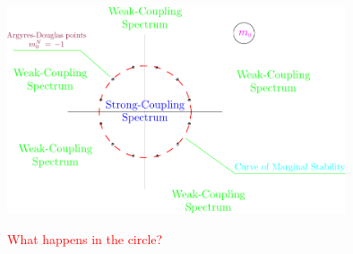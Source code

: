 \documentclass[12pt,letterpaper,landscape,KOMA,smallheadings,calcdimensions,display]{powersem}
\begin{document}
\begin{slide}

\vspace*{1.0cm}
\begin{center}
\includegraphics[width=10.0cm]{mplane.pdf}
\end{center}

\end{slide}


\begin{slide}

\centerline{\Huge \textcolor{red}{What happens in the circle?}}

\liststepwise{

\step{
\vspace{2cm}
\begin{center}
\Huge \textcolor{blue}{Mirror symmetry gives}

      \textcolor{blue}{the spectrum around the origin}
\end{center}
}
}

\end{slide}
\end{document}
